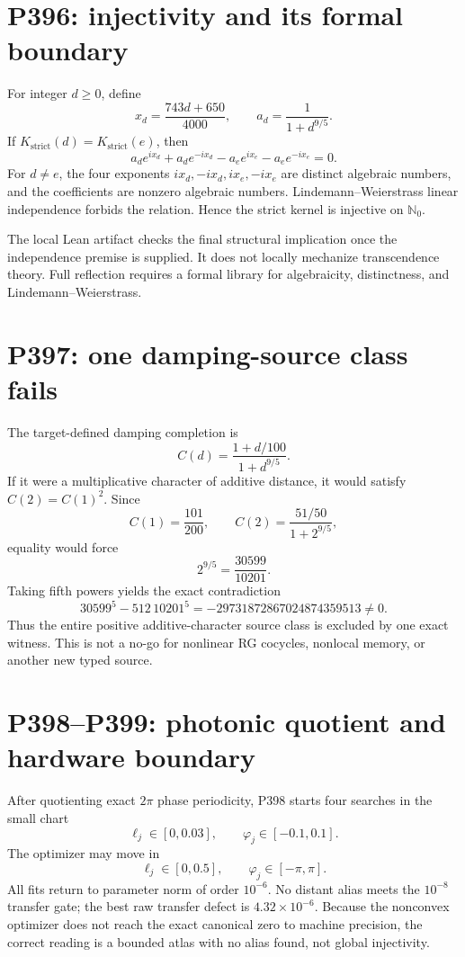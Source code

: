\documentclass[11pt,a4paper,openany]{report}
\newcommand{\N}{\mathbb N}
\begin{document}
\chapter{P396: injectivity and its formal boundary}

For integer $d\ge0$, define
\[
x_d=\frac{743d+650}{4000},\qquad
a_d=\frac{1}{1+d^{9/5}}.
\]
If $K_{\mathrm{strict}}(d)=K_{\mathrm{strict}}(e)$, then
\[
a_de^{ix_d}+a_de^{-ix_d}-a_ee^{ix_e}-a_ee^{-ix_e}=0.
\]
For $d\ne e$, the four exponents $ix_d,-ix_d,ix_e,-ix_e$ are distinct
algebraic numbers, and the coefficients are nonzero algebraic numbers.
Lindemann--Weierstrass linear independence forbids the relation. Hence the
strict kernel is injective on $\N_0$.

The local Lean artifact checks the final structural implication once the
independence premise is supplied. It does not locally mechanize
transcendence theory. Full reflection requires a formal library for
algebraicity, distinctness, and Lindemann--Weierstrass.

\chapter{P397: one damping-source class fails}

The target-defined damping completion is
\[
C(d)=\frac{1+d/100}{1+d^{9/5}}.
\]
If it were a multiplicative character of additive distance, it would satisfy
$C(2)=C(1)^2$. Since
\[
C(1)=\frac{101}{200},\qquad
C(2)=\frac{51/50}{1+2^{9/5}},
\]
equality would force
\[
2^{9/5}=\frac{30599}{10201}.
\]
Taking fifth powers yields the exact contradiction
\[
30599^5-512\,10201^5
=-29731872867024874359513\ne0.
\]
Thus the entire positive additive-character source class is excluded by one
exact witness. This is not a no-go for nonlinear RG cocycles, nonlocal memory,
or another new typed source.

\chapter{P398--P399: photonic quotient and hardware boundary}

After quotienting exact $2\pi$ phase periodicity, P398 starts four searches in
the small chart
\[
\ell_j\in[0,0.03],\qquad \varphi_j\in[-0.1,0.1].
\]
The optimizer may move in
\[
\ell_j\in[0,0.5],\qquad \varphi_j\in[-\pi,\pi].
\]
All fits return to parameter norm of order $10^{-6}$. No distant alias meets
the $10^{-8}$ transfer gate; the best raw transfer defect is
$4.32\times10^{-6}$. Because the nonconvex optimizer does not reach the exact
canonical zero to machine precision, the correct reading is a bounded atlas
with no alias found, not global injectivity.
\end{document}
